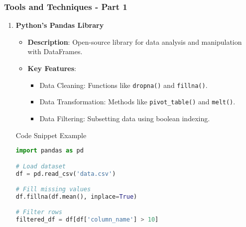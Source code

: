 \documentclass[aspectratio=169]{beamer}
\begin{document}
\begin{frame}[fragile]
    \frametitle{Tools and Techniques - Part 1}
    \begin{enumerate}
        \item \textbf{Python's Pandas Library}
            \begin{itemize}
                \item \textbf{Description}: Open-source library for data analysis and manipulation with DataFrames.
                \item \textbf{Key Features}:
                    \begin{itemize}
                        \item Data Cleaning: Functions like \texttt{dropna()} and \texttt{fillna()}.
                        \item Data Transformation: Methods like \texttt{pivot\_table()} and \texttt{melt()}.
                        \item Data Filtering: Subsetting data using boolean indexing.
                    \end{itemize}
            \end{itemize}
            \begin{block}{Code Snippet Example}
                \begin{lstlisting}[language=Python]
import pandas as pd

# Load dataset
df = pd.read_csv('data.csv')

# Fill missing values
df.fillna(df.mean(), inplace=True)

# Filter rows
filtered_df = df[df['column_name'] > 10]
                \end{lstlisting}
            \end{block}
    \end{enumerate}
\end{frame}
\end{document}
